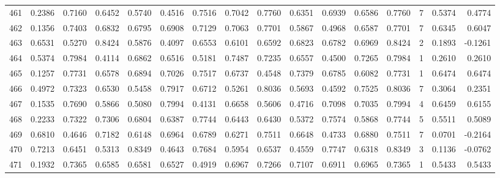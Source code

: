 \begin{tabular}{lrrrrrrrrrrrrrrr}
461 &      0.2386 &  0.7160 &  0.6452 &  0.5740 &  0.4516 &  0.7516 &  0.7042 &  0.7760 &  0.6351 &  0.6939 &   0.6586 &     0.7760 &      7 &                    0.5374 &                     0.4774 \\
462 &      0.1356 &  0.7403 &  0.6832 &  0.6795 &  0.6908 &  0.7129 &  0.7063 &  0.7701 &  0.5867 &  0.4968 &   0.6587 &     0.7701 &      7 &                    0.6345 &                     0.6047 \\
463 &      0.6531 &  0.5270 &  0.8424 &  0.5876 &  0.4097 &  0.6553 &  0.6101 &  0.6592 &  0.6823 &  0.6782 &   0.6969 &     0.8424 &      2 &                    0.1893 &                    -0.1261 \\
464 &      0.5374 &  0.7984 &  0.4114 &  0.6862 &  0.6516 &  0.5181 &  0.7487 &  0.7235 &  0.6557 &  0.4500 &   0.7265 &     0.7984 &      1 &                    0.2610 &                     0.2610 \\
465 &      0.1257 &  0.7731 &  0.6578 &  0.6894 &  0.7026 &  0.7517 &  0.6737 &  0.4548 &  0.7379 &  0.6785 &   0.6082 &     0.7731 &      1 &                    0.6474 &                     0.6474 \\
466 &      0.4972 &  0.7323 &  0.6530 &  0.5458 &  0.7917 &  0.6712 &  0.5261 &  0.8036 &  0.5693 &  0.4592 &   0.7525 &     0.8036 &      7 &                    0.3064 &                     0.2351 \\
467 &      0.1535 &  0.7690 &  0.5866 &  0.5080 &  0.7994 &  0.4131 &  0.6658 &  0.5606 &  0.4716 &  0.7098 &   0.7035 &     0.7994 &      4 &                    0.6459 &                     0.6155 \\
468 &      0.2233 &  0.7322 &  0.7306 &  0.6804 &  0.6387 &  0.7744 &  0.6443 &  0.6430 &  0.5372 &  0.7574 &   0.5868 &     0.7744 &      5 &                    0.5511 &                     0.5089 \\
469 &      0.6810 &  0.4646 &  0.7182 &  0.6148 &  0.6964 &  0.6789 &  0.6271 &  0.7511 &  0.6648 &  0.4733 &   0.6880 &     0.7511 &      7 &                    0.0701 &                    -0.2164 \\
470 &      0.7213 &  0.6451 &  0.5313 &  0.8349 &  0.4643 &  0.7684 &  0.5954 &  0.6537 &  0.4559 &  0.7747 &   0.6318 &     0.8349 &      3 &                    0.1136 &                    -0.0762 \\
471 &      0.1932 &  0.7365 &  0.6585 &  0.6581 &  0.6527 &  0.4919 &  0.6967 &  0.7266 &  0.7107 &  0.6911 &   0.6965 &     0.7365 &      1 &                    0.5433 &                     0.5433 \\

\end{tabular}
